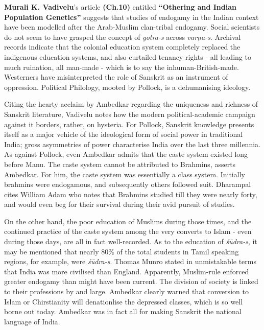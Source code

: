 \textbf{Murali K. Vadivelu}’s article \textbf{(Ch.10)} entitled \textbf{“Othering and Indian Population Genetics”} suggests that studies of endogamy in the Indian context have been modelled after the Arab-Muslim clan-tribal endogamy. Social scientists do not seem to have grasped the concept of \textit{gotra-s} across \textit{varṇa-s}. Archival records indicate that the colonial education system completely replaced the indigenous education systems, and also curtailed tenancy rights - all leading to much ruination, all man-made - which is to say the inhuman-British-made. Westerners have misinterpreted the role of Sanskrit as an instrument of oppression. Political Philology, mooted by Pollock, is a dehumanising ideology.


Citing the hearty acclaim by Ambedkar regarding the uniqueness and richness of Sanskrit literature, Vadivelu notes how the modern political-academic campaign against it borders, rather, on hysteria. For Pollock, Sanskrit knowledge presents itself as a major vehicle of the ideological form of social power in traditional India; gross asymmetries of power characterise India over the last three millennia. As against Pollock, even Ambedkar admits that the caste system existed long before Manu. The caste system cannot be attributed to Brahmins, asserts Ambedkar. For him, the caste system was essentially a class system. Initially brahmins were endogamous, and subsequently others followed suit. Dharampal cites William Adam who notes that Brahmins studied till they were nearly forty, and would even beg for their survival during their avid pursuit of studies.


On the other hand, the poor education of Muslims during those times, and the continued practice of the caste system among the very converts to Islam - even during those days, are all in fact well-recorded. As to the education of \textit{śūdra-s}, it may be mentioned that nearly 80\% of the total students in Tamil speaking regions, for example, were \textit{śūdra-s}. Thomas Munro stated in unmistakable terms that India was more civilised than England. Apparently, Muslim-rule enforced greater endogamy than might have been current. The division of society is linked to their professions by and large. Ambedkar clearly warned that conversion to Islam or Chirstianity will denationlise the depressed classes, which is so well borne out today. Ambedkar was in fact all for making Sanskrit the national language of India.

